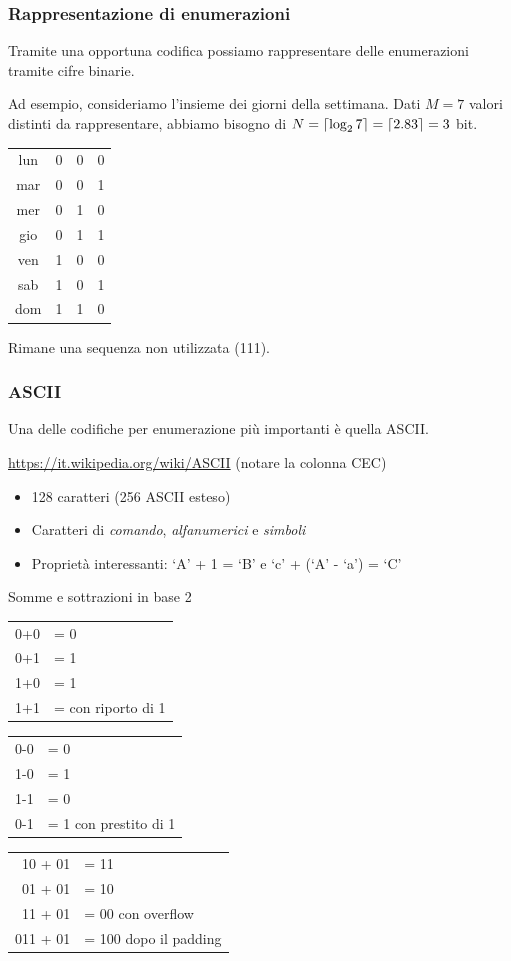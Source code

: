 \documentclass[aspectratio=169]{beamer}
\DeclarePairedDelimiter{\ceil}{\lceil}{\rceil}
\begin{document}
\begin{frame}
\frametitle{Rappresentazione di enumerazioni}
Tramite una opportuna codifica possiamo rappresentare delle enumerazioni tramite cifre binarie.

Ad esempio, consideriamo l'insieme dei giorni della settimana. Dati $M=7$ valori distinti da rappresentare, abbiamo bisogno di $N=\ceil{\log_2 7}=\ceil{2.83}=3$ bit.

\begin{table}[h]
	\begin{tabular}{cccc}
		lun&0&0&0\\
		mar&0&0&1\\
		mer&0&1&0\\
		gio&0&1&1\\
		ven&1&0&0\\
		sab&1&0&1\\
		dom&1&1&0
	\end{tabular}
\end{table}

Rimane una sequenza non utilizzata (111).
\end{frame}

\begin{frame}
\frametitle{ASCII}
Una delle codifiche per enumerazione più importanti è quella ASCII.

\href{https://it.wikipedia.org/wiki/ASCII}{https://it.wikipedia.org/wiki/ASCII} (notare la colonna CEC)

\begin{itemize}
\item 128 caratteri (256 ASCII esteso)
\item Caratteri di \emph{comando}, \emph{alfanumerici} e \emph{simboli}
\item Proprietà interessanti: `A' + 1 = `B' e `c' + (`A' - `a') = `C'
\end{itemize}
\end{frame}

\begin{frame}{Somme e sottrazioni in base 2}
	\begin{tabular}{r|l}
		0+0 & = 0 \\
		0+1 & = 1 \\
		1+0 & = 1 \\
		1+1 & = \pause 0 con \alert{riporto} di 1
	\end{tabular}
    \pause
\hspace{2cm}
	\begin{tabular}{r|l}
		0-0 & = 0 \\
		1-0 & = 1 \\
		1-1 & = 0 \\
		0-1 & = 1 con \alert{prestito} di 1
	\end{tabular}

\pause
\vspace{1cm}
	\begin{tabular}{r|l}
		 10 + 01 & = 11 \\
		 01 + 01 & = 10 \\
		 11 + 01 & = 00 con \alert{overflow} \\
		 011 + 01 & = 100 dopo il \alert{padding}
 	\end{tabular}
\end{frame}
\end{document}
